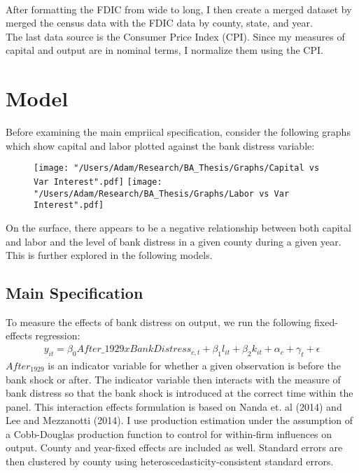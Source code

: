 \documentclass[letter,11pt]{article}
\begin{document}
{\\
\indent After formatting the FDIC from wide to long, I then create a merged dataset by merged the census data with the FDIC data by county, state, and year. 
\\
\indent The last data source is the Consumer Price Index (CPI). Since my measures of capital and output are in nominal terms, I normalize them using the CPI. 

\section{Model}


\indent Before examining the main empriical specification, consider the following graphs which show capital and labor plotted against the bank distress variable: 
\begin{figure}[!htb]
  \texttt{[image: "/Users/Adam/Research/BA\_Thesis/Graphs/Capital vs Var Interest".pdf]}
\endminipage\hfill
{}
  \texttt{[image: "/Users/Adam/Research/BA\_Thesis/Graphs/Labor vs Var Interest".pdf]}
\endminipage
\end{figure}

On the surface, there appears to be a negative relationship between both capital and labor and the level of bank distress in a given county during a given year. This is further explored in the following models.


\subsection{Main Specification}

To measure the effects of bank distress on output, we run the following fixed-effects regression:
\begin{align*}
y_{it} = \beta_0 After\_1929 x BankDistress_{c,t} + \beta_1 l_{it} + \beta_2 k_{it} + \alpha_c + \gamma_t + \epsilon
\end{align*}
$After_1929$ is an indicator variable for whether a given observation is before the bank shock or after. The indicator variable then interacts with the measure of bank distress so that the bank shock is introduced at the correct time within the panel. This interaction effects formulation is based on Nanda et. al (2014) and Lee and Mezzanotti (2014). I use production estimation under the assumption of a Cobb-Douglas production function to control for within-firm influences on output. County and year-fixed effects are included as well. Standard errors are then clustered by county using heteroscedasticity-consistent standard errors. 

}
\end{document}
